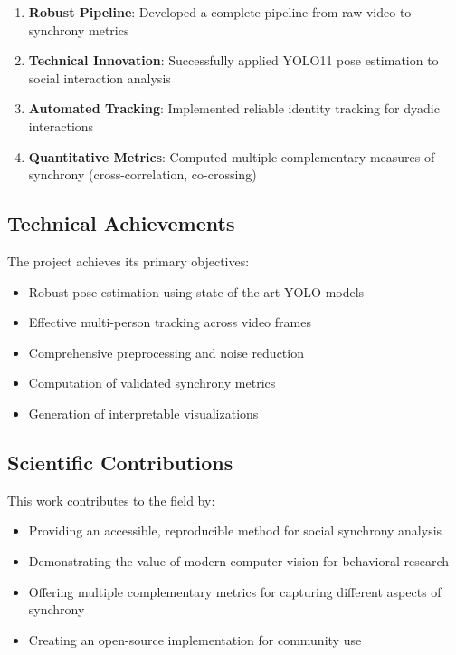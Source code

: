 \documentclass[11pt]{article}
\begin{document}
\begin{enumerate}
    \item \textbf{Robust Pipeline}: Developed a complete pipeline from raw video to synchrony metrics
    \item \textbf{Technical Innovation}: Successfully applied YOLO11 pose estimation to social interaction analysis
    \item \textbf{Automated Tracking}: Implemented reliable identity tracking for dyadic interactions
    \item \textbf{Quantitative Metrics}: Computed multiple complementary measures of synchrony (cross-correlation, co-crossing)
\end{enumerate}

\subsection{Technical Achievements}

The project achieves its primary objectives:
\begin{itemize}
    \item  Robust pose estimation using state-of-the-art YOLO models
    \item  Effective multi-person tracking across video frames
    \item Comprehensive preprocessing and noise reduction
    \item  Computation of validated synchrony metrics
    \item  Generation of interpretable visualizations
\end{itemize}

\subsection{Scientific Contributions}

This work contributes to the field by:
\begin{itemize}
    \item Providing an accessible, reproducible method for social synchrony analysis
    \item Demonstrating the value of modern computer vision for behavioral research
    \item Offering multiple complementary metrics for capturing different aspects of synchrony
    \item Creating an open-source implementation for community use
\end{itemize}
\end{document}
